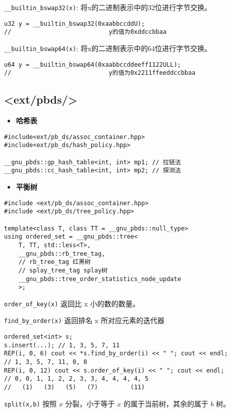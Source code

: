 \documentclass[a4paper,landscape,twocolumn]{ctexart}
\newcommand{\point}[1]{
	\begin{itemize}
		\item \textbf{#1}
	\end{itemize}
}
\begin{document}
\texttt{\_\_builtin\_bswap32(x)}: 将x的二进制表示中的32位进行字节交换。

\begin{lstlisting}
u32 y = __builtin_bswap32(0xaabbccddU);
//                           y的值为0xddccbbaa
\end{lstlisting}

\texttt{\_\_builtin\_bswap64(x)}: 将x的二进制表示中的64位进行字节交换。
\begin{lstlisting}
u64 y = __builtin_bswap64(0xaabbccddeeff1122ULL);
//                           y的值为0x2211ffeeddccbbaa
\end{lstlisting}

\subsection{<ext/pbds/>}

\point{哈希表}

\begin{lstlisting}
#include<ext/pb_ds/assoc_container.hpp>
#include<ext/pb_ds/hash_policy.hpp>

__gnu_pbds::gp_hash_table<int, int> mp1; // 拉链法
__gnu_pbds::cc_hash_table<int, int> mp2; // 探测法
\end{lstlisting}

\point{平衡树}

\begin{lstlisting}
#include <ext/pb_ds/assoc_container.hpp>
#include <ext/pb_ds/tree_policy.hpp>

template<class T, class TT = __gnu_pbds::null_type>
using ordered_set = __gnu_pbds::tree<
	T, TT, std::less<T>,
	__gnu_pbds::rb_tree_tag,
	// rb_tree_tag 红黑树
	// splay_tree_tag splay树
	__gnu_pbds::tree_order_statistics_node_update
	>;
\end{lstlisting}

\texttt{order\_of\_key(x)}  返回比 x 小的数的数量。

\texttt{find\_by\_order(x)}  返回排名 x 所对应元素的迭代器

\begin{lstlisting}
ordered_set<int> s;
s.insert(...); // 1, 3, 5, 7, 11
REP(i, 0, 6) cout << *s.find_by_order(i) << " "; cout << endl;
// 1, 3, 5, 7, 11, 0, 0
REP(i, 0, 12) cout << s.order_of_key(i) << " "; cout << endl;
// 0, 0, 1, 1, 2, 2, 3, 3, 4, 4, 4, 4, 5
//   (1)   (3)   (5)   (7)         (11)
\end{lstlisting}

\texttt{split(x,b)} 按照 $x$ 分裂，小于等于 $x$ 的属于当前树，其余的属于 $b$ 树。
\end{document}
